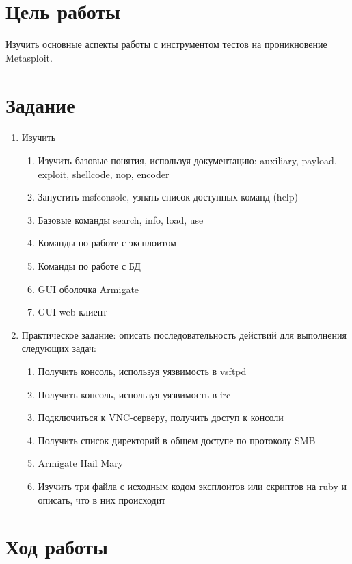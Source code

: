 \documentclass[10pt,a4paper,titlepage]{article}
\begin{document}
\tableofcontents
\newpage

\section{Цель работы}
Изучить основные аспекты работы с инструментом тестов на проникновение Metasploit.

\section{Задание}
\begin{enumerate}
	\item Изучить
	
\begin{enumerate}
	\item Изучить базовые понятия, используя документацию: auxiliary, payload, exploit, shellcode, nop, encoder
    \item Запустить msfconsole, узнать список доступных команд (help)
    \item Базовые команды search, info, load, use
    \item Команды по работе с эксплоитом
    \item Команды по работе с БД
    \item GUI оболочка Armigate
    \item GUI web-клиент
\end{enumerate}

    \item Практическое задание: описать последовательность действий для выполнения следующих задач:
    
\begin{enumerate}
    \item Получить консоль, используя уязвимость в vsftpd
    \item Получить консоль, используя уязвимость в irc
   	\item Подключиться к VNC-серверу, получить доступ к консоли
    \item Получить список директорий в общем доступе по протоколу SMB
    \item Armigate Hail Mary
    \item Изучить три файла с исходным кодом эксплоитов или скриптов на ruby и описать, что в них происходит
\end{enumerate}


\end{enumerate}

\section{Ход работы}
\end{document}
